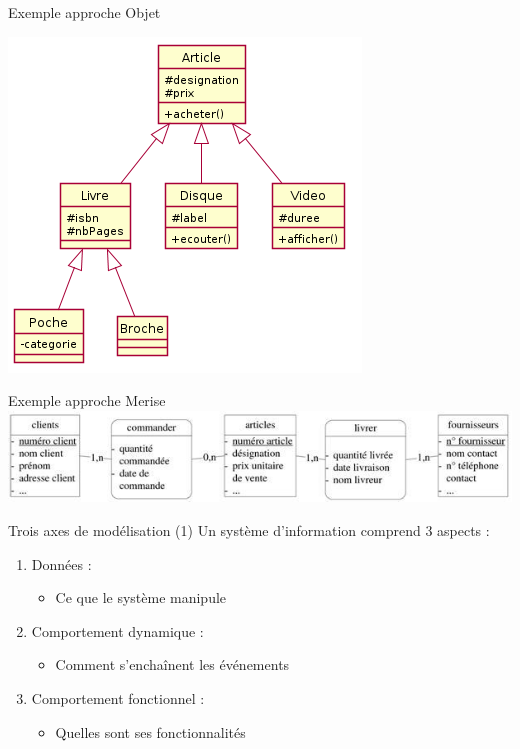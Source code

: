 \documentclass[14pt]{beamer}
\begin{document}
\begin{framentitle}{Exemple approche Objet}
    \begin{center}
    \includegraphics[width=.7\textwidth]{fig9.png}
    \end{center}
\end{framentitle}

\begin{framentitle}{Exemple approche Merise}
    \includegraphics[width=\textwidth]{fig10.jpg}
\end{framentitle}

\begin{framentitle}{Trois axes de modélisation (1)}
    Un système d'information comprend 3 aspects :
    \begin{enumerate}
        \item Données :
            \begin{itemize}
                \item Ce que le système manipule
            \end{itemize}
        \item Comportement dynamique :
            \begin{itemize}
                \item Comment s'enchaînent les événements
            \end{itemize}
        \item Comportement fonctionnel :
            \begin{itemize}
                \item Quelles sont ses fonctionnalités
            \end{itemize}
    \end{enumerate}
\end{framentitle}
\end{document}
